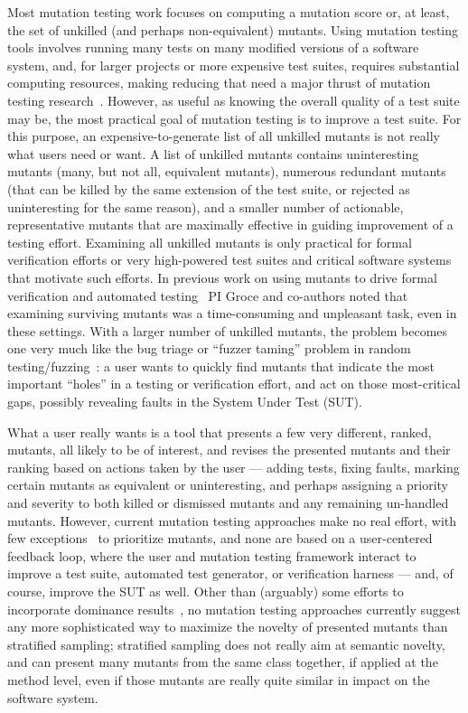 Most mutation testing work focuses on computing a mutation score or, at least, the set of unkilled (and perhaps non-equivalent) mutants.  Using mutation testing tools involves running many tests on many modified versions of a software system, and, for larger projects or more expensive test suites, requires substantial computing resources, making reducing that need a major thrust of mutation testing research~\cite{jia2011analysis}.  However, as useful as knowing the overall quality of a test suite may be, the most practical goal of mutation testing is to improve a test suite.  For this purpose, an expensive-to-generate list of all unkilled mutants is not really what users need or want.  A list of unkilled mutants contains uninteresting mutants (many, but not all, equivalent mutants), numerous redundant mutants (that can be killed by the same extension of the test suite, or rejected as uninteresting for the same reason), and a smaller number of actionable, representative mutants that are maximally effective in guiding improvement of a testing effort.  Examining all unkilled mutants is only practical for formal verification efforts or very high-powered test suites and critical software systems that motivate such efforts.  In previous work on using mutants to drive formal verification and automated testing~\cite{groce2015verified,groce2018verified,mutKernel} PI Groce and co-authors noted that examining surviving mutants was a time-consuming and unpleasant task, even in these settings.  With a larger number of unkilled mutants, the problem becomes one very much like the bug triage or ``fuzzer taming'' problem in random testing/fuzzing~\cite{PLDI13,SemCrash}:  a user wants to quickly find mutants that indicate the most important ``holes'' in a testing or verification effort, and act on those most-critical gaps, possibly revealing faults in the System Under Test (SUT).

What a user really wants is a tool that presents a few very different, ranked, mutants, all likely to be of interest, and revises the presented mutants and their ranking based on actions taken by the user --- adding tests, fixing faults, marking certain mutants as equivalent or uninteresting, and perhaps assigning a priority and severity to both killed or dismissed mutants and any remaining un-handled mutants. However, current mutation testing approaches make no real effort, with few exceptions~\cite{MutGoogle,FaRM} to prioritize mutants, and none are based on a user-centered feedback loop, where the user and mutation testing framework interact to improve a test suite, automated test generator, or verification harness --- and, of course, improve the SUT as well.  Other than (arguably) some efforts to incorporate dominance results~\cite{MutQuality}, no mutation testing approaches currently suggest any more sophisticated way to maximize the novelty of presented mutants than stratified sampling; stratified sampling does not really aim at semantic novelty, and can present many mutants from the same class together, if applied at the method level, even if those mutants are really quite similar in impact on the software system.

